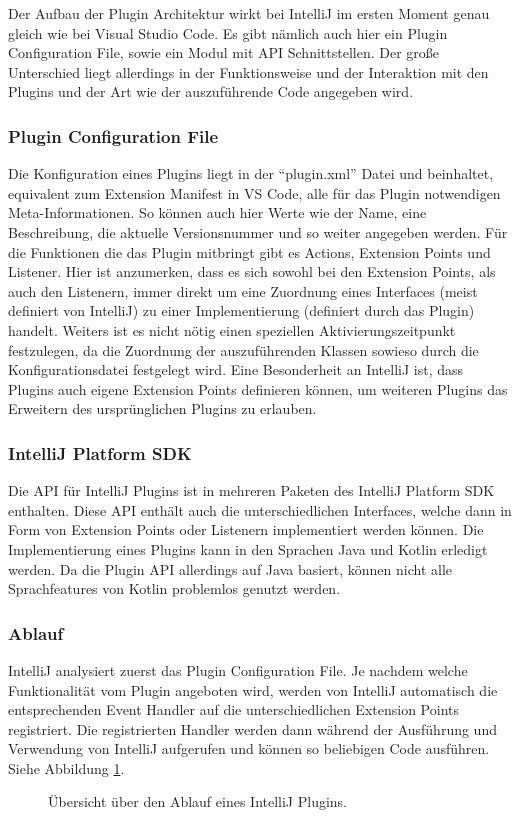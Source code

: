 Der Aufbau der Plugin Architektur wirkt bei IntelliJ im ersten Moment genau
gleich wie bei Visual Studio Code. Es gibt nämlich auch hier ein Plugin Configuration 
File, sowie ein Modul mit API Schnittstellen.
Der große Unterschied liegt allerdings in der Funktionsweise und der Interaktion
mit den Plugins und der Art wie der auszuführende Code angegeben wird.
\subsubsection{Plugin Configuration File}
  Die Konfiguration eines Plugins liegt in der \enquote{plugin.xml} Datei und
  beinhaltet, equivalent zum Extension Manifest in VS Code, alle für das Plugin
  notwendigen Meta-Informationen. So können auch hier Werte wie der Name,
  eine Beschreibung, die aktuelle Versionsnummer und so weiter angegeben werden.
  Für die Funktionen die das Plugin mitbringt gibt es Actions, Extension Points
  und Listener. Hier ist anzumerken, dass es sich sowohl bei den Extension Points,
  als auch den Listenern, immer direkt um eine Zuordnung eines Interfaces
  (meist definiert von IntelliJ) zu einer Implementierung (definiert durch das Plugin)
  handelt. Weiters ist es nicht nötig einen speziellen Aktivierungszeitpunkt
  festzulegen, da die Zuordnung der auszuführenden Klassen sowieso durch 
  die Konfigurationsdatei festgelegt wird. Eine Besonderheit an IntelliJ ist,
  dass Plugins auch eigene Extension Points definieren können, um weiteren Plugins
  das Erweitern des ursprünglichen Plugins zu erlauben.
\subsubsection{IntelliJ Platform SDK}
  Die API für IntelliJ Plugins ist in mehreren Paketen des IntelliJ 
  Platform SDK enthalten. Diese API enthält auch die unterschiedlichen
  Interfaces, welche dann in Form von Extension Points oder Listenern implementiert
  werden können. Die Implementierung eines Plugins kann in den Sprachen Java
  und Kotlin erledigt werden. Da die Plugin API allerdings auf Java basiert, können
  nicht alle Sprachfeatures von Kotlin problemlos genutzt werden.
\subsubsection{Ablauf}
  IntelliJ analysiert zuerst das Plugin Configuration File.
  Je nachdem welche Funktionalität vom Plugin angeboten wird, werden
  von IntelliJ automatisch die entsprechenden Event Handler 
  auf die unterschiedlichen Extension Points registriert. 
  Die registrierten Handler werden dann während der Ausführung und Verwendung
  von IntelliJ aufgerufen und können so beliebigen Code ausführen.
  Siehe Abbildung \ref{fig:diagram_IntelliJExtensionArchitecture}.
  \begin{figure}
    \centering
    \caption{Übersicht über den Ablauf eines IntelliJ Plugins.}
    \label{fig:diagram_IntelliJExtensionArchitecture}
  \end{figure}   

